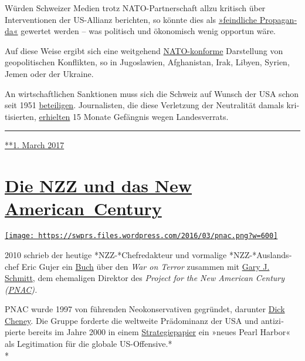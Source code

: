 Würden Schweizer Medien trotz NATO-Part­ner­schaft allzu kritisch über
Interventionen der US-Allianz berichten, so könnte dies als
\href{https://swprs.org/russische-propaganda/}{»feind­li­che
Pro­pa­gan­da«} ge­wer­tet werden -- was po­li­tisch und ökonomisch
wenig opportun wäre.

Auf diese Weise ergibt sich eine weitgehend
\href{https://swprs.org/medien-navigator/}{NATO-kon­forme} Darstellung
von geopolitischen Kon­flik­ten, so in Jugoslawien, Afgha­ni­stan, Irak,
Li­by­en, Syrien, Jemen oder der Ukraine.

An wirtschaftlichen Sanktionen muss sich die Schweiz auf Wunsch der USA
schon seit 1951
\href{https://de.wikipedia.org/wiki/Hotz-Linder-Agreement}{be­tei­li­gen}.
Jour­na­listen, die diese Ver­letzung der Neu­tra­lität damals
kri­ti­sierten,
\href{https://web.archive.org/web/20141206061445/http://buchundnetz.com/online-buch/schnueffelstaat-schweiz-ob/iii-modernisieren-oder-abschaffen/staatsschutz-je-nach-wetterlage/}{er­hielten}
15 Mo­nate Gefäng­nis wegen Landes­verrats.

\begin{center}\rule{0.5\linewidth}{\linethickness}\end{center}

\href{https://swprs.org/2017/03/01/schweizer-medien-nato/}{**1. March
2017}

\hypertarget{die-nzz-und-das-new-american-century}{%
\section{\texorpdfstring{\href{https://swprs.org/2017/03/01/nzz-new-american-century/}{Die
NZZ und das New
American~Century}}{Die NZZ und das New American~Century}}\label{die-nzz-und-das-new-american-century}}

\href{https://swprs.org/2017/03/01/nzz-new-american-century/}{\texttt{[image: https://swprs.files.wordpress.com/2016/03/pnac.png?w=600]}}

2010 schrieb der heutige *NZZ-*Chef­re­dakteur und vor­ma­lige
*NZZ-*Aus­lands­chef Eric Gujer ein
\href{https://www.amazon.com/Safety-Liberty-Islamist-Terrorism-Counterterrorism/dp/084474333X}{Buch}
über den \emph{War on Terror} zu­sammen mit
\href{https://en.wikipedia.org/wiki/Gary_Schmitt}{Gary J. Schmitt}, dem
ehe­ma­li­gen Dir­ektor des \emph{Project for the New American Century
(\href{https://en.wikipedia.org/wiki/Project_for_the_New_American_Century}{PNAC}).}

PNAC wurde 1997 von füh­ren­den Neo­kon­ser­va­ti­ven ge­gründet,
darunter \href{https://de.wikipedia.org/wiki/Dick_Cheney}{Dick Cheney}.
Die Gruppe for­derte die weltweite Prädominanz der USA und
anti­zi­pierte be­reits im Jahre 2000 in ei­nem
\href{https://web.archive.org/web/20130817122719/http://www.newamericancentury.org/RebuildingAmericasDefenses.pdf}{Stra­tegie­­papier}
ein »neues Pearl Harbor« als Legi­ti­ma­tion für die globale
US-Offensive.*\\
*

